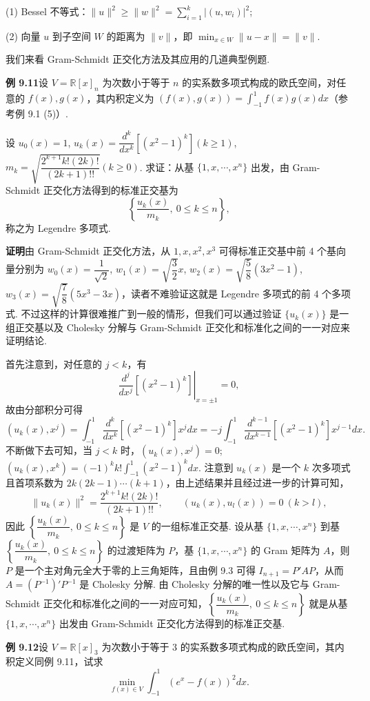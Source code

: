 \documentclass[UTF8,12pt,a4paper,fontset=fandol]{ctexart}
\begin{document}
(1) Bessel 不等式：$\|u\|^2\ge \|w\|^2=\sum_{i=1}^k |(u,w_i)|^2$;

(2) 向量 $u$ 到子空间 $W$ 的距离为 $\|v\|$，即 $\min_{x\in W}\|u-x\|=\|v\|$.

我们来看 Gram-Schmidt 正交化方法及其应用的几道典型例题.

\noindent\textbf{例 9.11}\quad 设 $V=\mathbb{R}[x]_n$ 为次数小于等于 $n$ 的实系数多项式构成的欧氏空间，对任意的 $f(x),g(x)$，其内积定义为 $(f(x),g(x))=\int_{-1}^1 f(x)g(x)dx$（参考例 9.1 (5)）.

设 $u_0(x)=1$, $u_k(x)=\dfrac{d^k}{dx^k}\left[(x^2-1)^k\right](k\ge 1)$, $m_k=\sqrt{\dfrac{2^{k+1}k!(2k)!}{(2k+1)!!}}(k\ge 0)$. 求证：从基 $\{1,x,\cdots,x^n\}$ 出发，由 Gram-Schmidt 正交化方法得到的标准正交基为
\[
\left\{\frac{u_k(x)}{m_k},\ 0\le k\le n\right\},
\]
称之为 Legendre 多项式.

\noindent\textbf{证明}\quad 由 Gram-Schmidt 正交化方法，从 $1,x,x^2,x^3$ 可得标准正交基中前 4 个基向量分别为 $w_0(x)=\dfrac1{\sqrt2}$, $w_1(x)=\sqrt{\dfrac32}x$, $w_2(x)=\sqrt{\dfrac58}(3x^2-1)$, $w_3(x)=\sqrt{\dfrac78}(5x^3-3x)$，读者不难验证这就是 Legendre 多项式的前 4 个多项式. 不过这样的计算很难推广到一般的情形，但我们可以通过验证 $\{u_k(x)\}$ 是一组正交基以及 Cholesky 分解与 Gram-Schmidt 正交化和标准化之间的一一对应来证明结论.

首先注意到，对任意的 $j<k$，有
\[
\left.\frac{d^j}{dx^j}\left[(x^2-1)^k\right]\right|_{x=\pm1}=0,
\]
故由分部积分可得
\[
(u_k(x),x^j)=\int_{-1}^1 \frac{d^k}{dx^k}\left[(x^2-1)^k\right]x^jdx
=-j\int_{-1}^1 \frac{d^{k-1}}{dx^{k-1}}\left[(x^2-1)^k\right]x^{j-1}dx.
\]
不断做下去可知，当 $j<k$ 时，$(u_k(x),x^j)=0$; $(u_k(x),x^k)=(-1)^kk!\int_{-1}^1 (x^2-1)^kdx$. 注意到 $u_k(x)$ 是一个 $k$ 次多项式且首项系数为 $2k(2k-1)\cdots(k+1)$，由上述结果并且经过进一步的计算可知，
\[
\|u_k(x)\|^2=\frac{2^{k+1}k!(2k)!}{(2k+1)!!},\qquad (u_k(x),u_l(x))=0\ (k>l),
\]
因此 $\left\{\dfrac{u_k(x)}{m_k},\ 0\le k\le n\right\}$ 是 $V$ 的一组标准正交基. 设从基 $\{1,x,\cdots,x^n\}$ 到基 $\left\{\dfrac{u_k(x)}{m_k},\ 0\le k\le n\right\}$ 的过渡矩阵为 $P$，基 $\{1,x,\cdots,x^n\}$ 的 Gram 矩阵为 $A$，则 $P$ 是一个主对角元全大于零的上三角矩阵，且由例 9.3 可得 $I_{n+1}=P'AP$，从而 $A=(P^{-1})'P^{-1}$ 是 Cholesky 分解. 由 Cholesky 分解的唯一性以及它与 Gram-Schmidt 正交化和标准化之间的一一对应可知，$\left\{\dfrac{u_k(x)}{m_k},\ 0\le k\le n\right\}$ 就是从基 $\{1,x,\cdots,x^n\}$ 出发由 Gram-Schmidt 正交化方法得到的标准正交基.

\noindent\textbf{例 9.12}\quad 设 $V=\mathbb{R}[x]_3$ 为次数小于等于 3 的实系数多项式构成的欧氏空间，其内积定义同例 9.11，试求
\[
\min_{f(x)\in V}\int_{-1}^1 (e^x-f(x))^2dx.
\]
\end{document}
